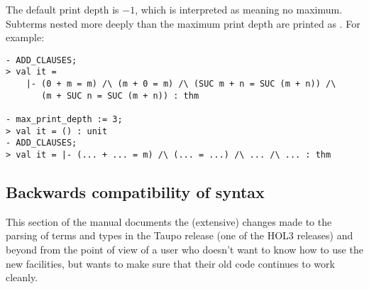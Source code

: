 {

\noindent The default print depth is $-1$, which is interpreted as
meaning no maximum.  Subterms nested more deeply than the maximum
print depth are printed as . For example:

\setcounter{sessioncount}{1}
\begin{session}
\begin{hol}
\begin{verbatim}
- ADD_CLAUSES;
> val it =
    |- (0 + m = m) /\ (m + 0 = m) /\ (SUC m + n = SUC (m + n)) /\
       (m + SUC n = SUC (m + n)) : thm

- max_print_depth := 3;
> val it = () : unit
- ADD_CLAUSES;
> val it = |- (... + ... = m) /\ (... = ...) /\ ... /\ ... : thm
\end{verbatim}
\end{hol}
\end{session}


\subsection{Backwards compatibility of syntax}

This section of the manual documents the (extensive) changes made to
the parsing of \HOL{} terms and types in the Taupo release (one of the
HOL3 releases) and beyond from the point of view of a user who doesn't
want to know how to use the new facilities, but wants to make sure
that their old code continues to work cleanly.

}
